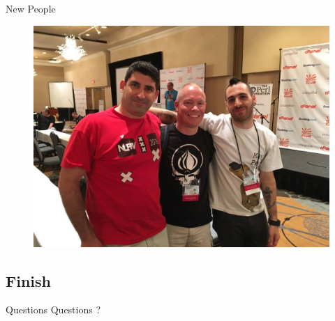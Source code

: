 \begin{frame}{New People}
\begin{figure}[!ht]
\centering
\includegraphics[width=1\linewidth]{img/crowd.png}
\end{figure}
\end{frame}

\subsection{Finish}

\begin{frame}{Questions}
\centering
Questions ?
\end{frame}



